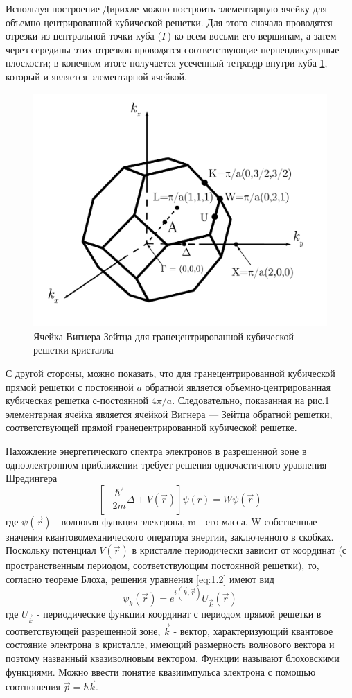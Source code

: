 Используя построение Дирихле можно построить элементарную ячейку для объемно-центрированной кубической решетки. Для
этого сначала проводятся отрезки из центральной точки куба ($\Gamma$) ко всем восьми его вершинам, а затем через середины этих
отрезков проводятся соответствующие перпендикулярные плоскости; в конечном итоге получается усеченный тетраэдр внутри
куба \ref{fig:1.4}, который и является элементарной ячейкой.
\begin{figure}[h!]
	\centering
	\includegraphics[width = .8\linewidth]{img/14}
	\caption{Ячейка Вигнера-Зейтца для гранецентрированной кубической решетки кристалла}
	\label{fig:1.4}
\end{figure}
С другой стороны, можно показать, что для гранецентрированной кубической прямой решетки с постоянной $a$ обратной является
объемно-центрированная кубическая решетка с-постоянной $4 \pi /a$. Следовательно, показанная на рис.\ref{fig:1.4} элементарная ячейка
является ячейкой Вигнера — Зейтца обратной решетки, соответствующей прямой гранецентрированной кубической решетке.

Нахождение энергетического спектра электронов в разрешенной зоне в одноэлектронном приближении требует решения одночастичного уравнения Шредингера
\begin{equation}
	\left[-\frac{\hbar^{2}}{2 m} \Delta+V(\vec{r})\right] \psi(r)=W \psi(\vec{r})
	\label{eq:1.4}
\end{equation}
где $\psi(\vec{r})$ - волновая функция электрона, m - его масса, W собственные значения квантовомеханического оператора
энергии, заключенного в скобках. Поскольку потенциал $V(\vec{r})$ в кристалле периодически зависит от координат (с
пространственным периодом, соответствующим постоянной решетки), то, согласно теореме Блоха, решения уравнения
\eqref{eq:1.2} имеют вид
\begin{equation}
	\psi_{k}(\vec{r})=e^{i(\vec{k}, \vec{r})} U_{\vec{k}}(\vec{r})
	\label{eq:1.5}
\end{equation}
где $ U_{\vec{k}}$ - периодические функции координат с периодом прямой решетки в соответствующей разрешенной зоне,
$\vec{k}$ - вектор, характеризующий квантовое состояние электрона в кристалле, имеющий размерность волнового вектора и
поэтому названный квазиволновым вектором. Функции называют блоховскими функциями. Можно ввести понятие квазиимпульса
электрона с помощью соотношения $\vec{p}=\hbar \vec{k}$.

